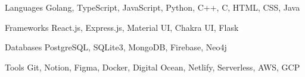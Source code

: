 

\begin{cvskills}

  \cvskill
    {Languages} %
    {Golang, TypeScript, JavaScript, Python, C++, C, HTML, CSS, Java} %

  \cvskill
    {Frameworks} %
    {React.js, Express.js, Material UI, Chakra UI, Flask} %

  \cvskill
    {Databases} %
    {PostgreSQL, SQLite3, MongoDB, Firebase, Neo4j} %

  \cvskill
    {Tools} %
    {Git, Notion, Figma, Docker, Digital Ocean, Netlify, Serverless, AWS, GCP} %

\end{cvskills}
